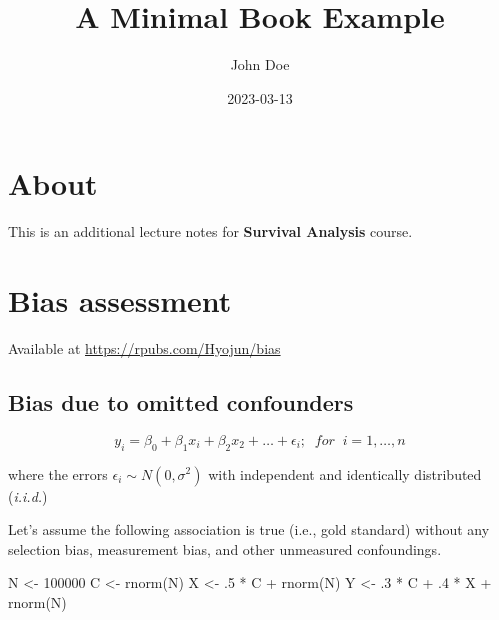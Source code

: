 \documentclass[
]{book}
\title{A Minimal Book Example}
\author{John Doe}
\date{2023-03-13}
\newenvironment{Shaded}{\begin{snugshade}}{\end{snugshade}}
\newcommand{\DecValTok}[1]{\textcolor[rgb]{0.00,0.00,0.81}{#1}}
\newcommand{\FunctionTok}[1]{\textcolor[rgb]{0.00,0.00,0.00}{#1}}
\newcommand{\NormalTok}[1]{#1}
\newcommand{\OtherTok}[1]{\textcolor[rgb]{0.56,0.35,0.01}{#1}}
\newcommand{\SpecialCharTok}[1]{\textcolor[rgb]{0.00,0.00,0.00}{#1}}
\begin{document}
\maketitle

{
\setcounter{tocdepth}{1}
\tableofcontents
}
\hypertarget{about}{%
\chapter{About}\label{about}}

This is an additional lecture notes for \textbf{Survival Analysis} course.

\hypertarget{bias-assessment}{%
\chapter{Bias assessment}\label{bias-assessment}}

Available at \url{https://rpubs.com/Hyojun/bias}

\newpage

\hypertarget{bias-due-to-omitted-confounders}{%
\section{Bias due to omitted confounders}\label{bias-due-to-omitted-confounders}}

\[y_i = \beta_0 + \beta_1 x_i + \beta_2 x_2 + \dots + \epsilon_i; \;\; for \;\; i=1, \dots, n\]

where the errors \(\epsilon_i \sim N(0, \sigma^2)\) with independent and identically distributed (\emph{i.i.d.})

Let's assume the following association is true (i.e., gold standard) without any selection bias, measurement bias, and other unmeasured confoundings.

\begin{Shaded}
\begin{Highlighting}[]
\NormalTok{N }\OtherTok{\textless{}{-}} \DecValTok{100000}
\NormalTok{C }\OtherTok{\textless{}{-}} \FunctionTok{rnorm}\NormalTok{(N)}
\NormalTok{X }\OtherTok{\textless{}{-}}\NormalTok{ .}\DecValTok{5} \SpecialCharTok{*}\NormalTok{ C }\SpecialCharTok{+} \FunctionTok{rnorm}\NormalTok{(N)}
\NormalTok{Y }\OtherTok{\textless{}{-}}\NormalTok{ .}\DecValTok{3} \SpecialCharTok{*}\NormalTok{ C }\SpecialCharTok{+}\NormalTok{ .}\DecValTok{4} \SpecialCharTok{*}\NormalTok{ X }\SpecialCharTok{+} \FunctionTok{rnorm}\NormalTok{(N)}
\end{Highlighting}
\end{Shaded}
\end{document}
